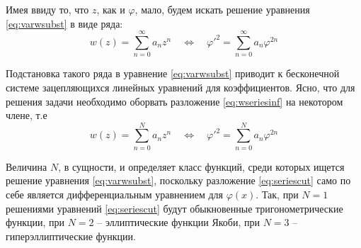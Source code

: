 Имея ввиду то, что $z$, как и $\varphi$, мало, будем искать решение уравнения \eqref{eq:varwsubst} в виде ряда:
\begin{equation}
w(z) = \sum_{n=0}^\infty a_n z^n \quad \Leftrightarrow \quad 
\varphi'^2 = \sum_{n=0}^\infty a_n \varphi^{2n}
\label{eq:wseriesinf}
\end{equation}

Подстановка такого ряда в уравнение \eqref{eq:varwsubst} приводит к бесконечной системе зацепляющихся линейных уравнений для коэффициентов.
Ясно, что для решения задачи необходимо оборвать разложение \eqref{eq:wseriesinf} на некотором члене, т.е 
\begin{equation}
w(z) = \sum_{n=0}^N a_n z^n \quad \Leftrightarrow \quad 
\varphi'^2 = \sum_{n=0}^N a_n \varphi^{2n}
\label{eq:seriescut}
\end{equation}

Величина $N$, в сущности, и определяет класс функций, среди которых ищется решение уравнения \eqref{eq:varwsubst}, поскольку разложение \eqref{eq:seriescut} само по себе является дифференциальным уравнением для $\varphi(x)$.
Так, при $N=1$ решениями уравнений \eqref{eq:seriescut} будут обыкновенные тригонометрические функции, при $N=2$ -- эллиптические функции Якоби, при $N=3$ -- гиперэллиптические функции.
